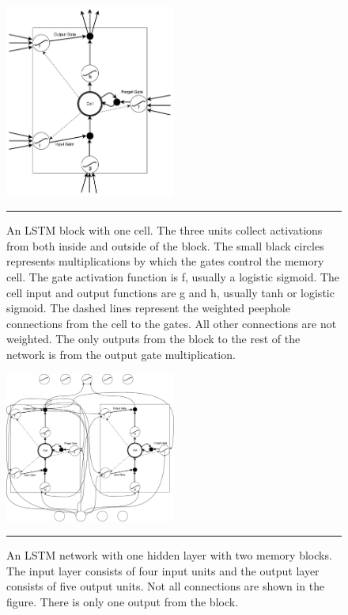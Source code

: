 \begin{figure}[htbp]
  \centering
    \includegraphics[width=0.5\textwidth,height=0.5\textheight,keepaspectratio]{Figures/lstm-block.pdf}
    \rule{35em}{0.5pt}
  \caption[An LSTM block with one cell]
{An LSTM block with one cell. The three units collect activations from both inside and outside of
the block. The small black circles represents multiplications by which the gates control the
memory cell. The gate activation function is f, usually a logistic sigmoid. The cell input and
output functions are g and h, usually tanh or logistic sigmoid. The dashed lines represent the
weighted peephole connections from the cell to the gates. All other connections are not weighted.
The only outputs from the block to the rest of the network is from the output gate multiplication.}
  \label{fig:lstmBlock}
\end{figure}

\begin{figure}[htbp]
  \centering
    \includegraphics[width=0.5\textwidth,height=0.5\textheight,keepaspectratio]{Figures/lstm-network.pdf}
    \rule{35em}{0.5pt}
  \caption[An LSTM network]
{An LSTM network with one hidden layer with two memory blocks. The input layer consists of
four input units and the output layer consists of five output units. Not all connections are
shown in the figure. There is only one output from the block.}
  \label{fig:lstmNetwork}
\end{figure}

